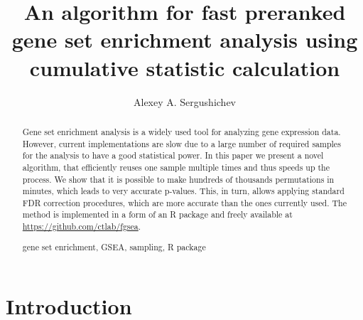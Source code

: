 \documentclass[runningheads,a4paper]{llncs}
\newcommand{\keywords}[1]{\par\addvspace\baselineskip
\noindent\keywordname\enspace\ignorespaces#1}
\begin{document}
\mainmatter  %

\title{An algorithm for fast preranked gene set enrichment analysis using 
    cumulative statistic calculation}


%
\author{Alexey A. Sergushichev}
%


%
%

\maketitle

\begin{abstract}
Gene set enrichment analysis is a widely used tool for analyzing gene 
expression data. However, current implementations are slow due to a large
number of required samples for the analysis to have a good statistical power.
In this paper we present a novel algorithm, that efficiently reuses
one sample multiple times and thus speeds up the process.
We show that it is possible to make hundreds of thousands permutations 
in minutes, which leads to very accurate p-values. This, in turn,
allows applying standard FDR correction procedures, which are
more accurate than the ones currently used.
The method is implemented in a form of an R package and 
freely available at \url{https://github.com/ctlab/fgsea}.

\keywords{gene set enrichment, GSEA, sampling, R package}
\end{abstract}


\section{Introduction}
\end{document}
